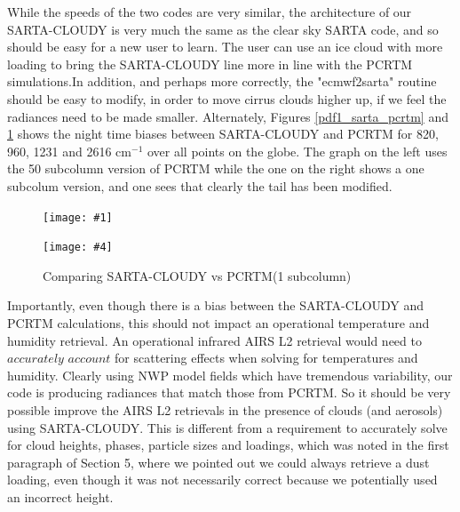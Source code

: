 \documentclass[11pt]{article}
\newcommand{\sa}{\textsf{SARTA}\xspace}
\newcommand{\sasc}{\textsf{SARTA-CLOUDY}\xspace}
\newcommand{\pcrtm}{\textsf{PCRTM}\xspace}
\newcommand{\dfigure}[6]
{
\begin{figure}
  \begin{minipage}[t]{0.45\textwidth}
  \centering
  \texttt{[image: \#1]}
   \caption{#2}  \label{#3}
  \end{minipage}
  \hfil
  \begin{minipage}[t]{0.45\linewidth}
  \centering
  \texttt{[image: \#4]}
   \caption{#5}  \label{#6}
  \end{minipage}
\end{figure}
}
\newcommand{\wn}{cm$^{-1}$\xspace}
\begin{document}
While the speeds of the two codes are very similar, the architecture of our \sasc is very much the same as 
the clear sky \sa code, and so should be easy for a new user to learn. The user can use an ice cloud with 
more loading to bring the \sasc line more in line with the \pcrtm simulations.In addition, and perhaps
more correctly, the "ecmwf2sarta" routine should be easy to modify, in order to move cirrus clouds higher 
up, if we feel the radiances need to be made smaller. Alternately, Figures \ref{pdf1_sarta_pcrtm} and 
\ref{pdf2_sarta_pcrtm} shows the night time biases between \sasc and \pcrtm for 820, 960, 1231 and 2616 \wn
over all points on the globe. The graph on the left uses the 50 subcolumn version of \pcrtm while the one on the right 
shows a one subcolum version, and one sees that clearly the tail has been modified.

\dfigure{Figs/pcrtm_calc_vs_sarta_calc_histV1.jpg}{Comparing \sasc vs \pcrtm (50 subcolumns)}{pdf1_sarta_pcrtm}{Figs/pcrtm_calc_vs_sarta_calc_histV2.jpg}{Comparing \sasc vs \pcrtm (1 subcolumn)}{pdf2_sarta_pcrtm}

Importantly, even though there is a bias between the \sasc and \pcrtm calculations, this should not impact an operational
temperature and humidity retrieval. An operational infrared AIRS L2 retrieval would need to $accurately$ $account$ for 
scattering effects when solving for temperatures and humidity. Clearly using NWP model fields which have tremendous 
variability, our code is producing radiances that match those from \pcrtm. So it should be very possible improve the 
AIRS L2 retrievals in the presence of clouds (and aerosols) using \sasc. This is different from a requirement to accurately 
solve for cloud heights, phases, particle sizes and loadings, which was noted in the first paragraph of Section 5, where
we pointed out we could always retrieve a dust loading, even though it was not necessarily correct because we potentially
used an incorrect height.



\end{document}

